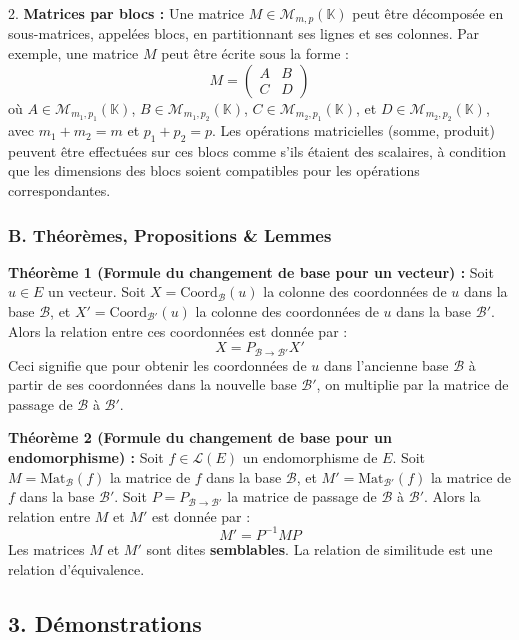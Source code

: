 \documentclass{report}
\begin{document}
2.  \textbf{Matrices par blocs :}
    Une matrice $M \in \mathcal{M}_{m,p}(\mathbb{K})$ peut être décomposée en sous-matrices, appelées blocs, en partitionnant ses lignes et ses colonnes.
    Par exemple, une matrice $M$ peut être écrite sous la forme :
    $$M = \begin{pmatrix} A & B \\ C & D \end{pmatrix}$$
    où $A \in \mathcal{M}_{m_1, p_1}(\mathbb{K})$, $B \in \mathcal{M}_{m_1, p_2}(\mathbb{K})$, $C \in \mathcal{M}_{m_2, p_1}(\mathbb{K})$, et $D \in \mathcal{M}_{m_2, p_2}(\mathbb{K})$, avec $m_1+m_2=m$ et $p_1+p_2=p$.
    Les opérations matricielles (somme, produit) peuvent être effectuées sur ces blocs comme s'ils étaient des scalaires, à condition que les dimensions des blocs soient compatibles pour les opérations correspondantes.

\subsubsection*{B. Théorèmes, Propositions \& Lemmes}

\textbf{Théorème 1 (Formule du changement de base pour un vecteur) :}
Soit $u \in E$ un vecteur. Soit $X = \text{Coord}_{\mathcal{B}}(u)$ la colonne des coordonnées de $u$ dans la base $\mathcal{B}$, et $X' = \text{Coord}_{\mathcal{B}'}(u)$ la colonne des coordonnées de $u$ dans la base $\mathcal{B}'$. Alors la relation entre ces coordonnées est donnée par :
$$X = P_{\mathcal{B} \to \mathcal{B}'} X'$$
Ceci signifie que pour obtenir les coordonnées de $u$ dans l'ancienne base $\mathcal{B}$ à partir de ses coordonnées dans la nouvelle base $\mathcal{B}'$, on multiplie par la matrice de passage de $\mathcal{B}$ à $\mathcal{B}'$.

\textbf{Théorème 2 (Formule du changement de base pour un endomorphisme) :}
Soit $f \in \mathcal{L}(E)$ un endomorphisme de $E$. Soit $M = \text{Mat}_{\mathcal{B}}(f)$ la matrice de $f$ dans la base $\mathcal{B}$, et $M' = \text{Mat}_{\mathcal{B}'}(f)$ la matrice de $f$ dans la base $\mathcal{B}'$. Soit $P = P_{\mathcal{B} \to \mathcal{B}'}$ la matrice de passage de $\mathcal{B}$ à $\mathcal{B}'$. Alors la relation entre $M$ et $M'$ est donnée par :
$$M' = P^{-1} M P$$
Les matrices $M$ et $M'$ sont dites \textbf{semblables}. La relation de similitude est une relation d'équivalence.

\subsection*{3. Démonstrations}
\end{document}
